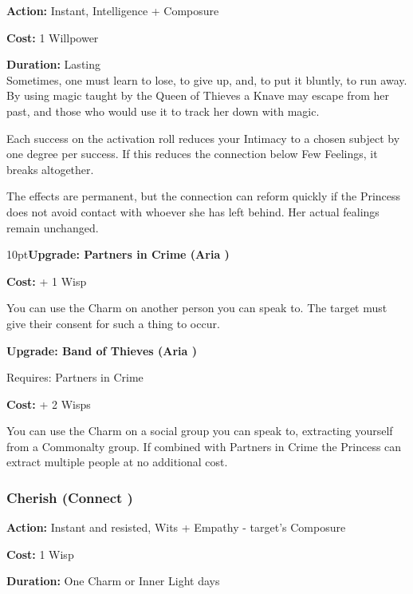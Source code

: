 \noindent \textbf{Action:} Instant, Intelligence + Composure 

\noindent \textbf{Cost:} 1 Willpower

\noindent \textbf{Duration:} Lasting \\

\noindent Sometimes, one must learn to lose, to give up, and, to put it bluntly, to run away. By using magic taught by the Queen of Thieves a Knave may escape from her past, and those who would use it to track her down with magic.

Each success on the activation roll reduces your Intimacy to a chosen subject by one degree per success. If this reduces the connection below Few Feelings, it breaks altogether. 

The effects are permanent, but the connection can reform quickly if the Princess does not avoid contact with whoever she has left behind. Her actual fealings remain unchanged.

\begin{myindentpar}{10pt}\textbf{Upgrade: Partners in Crime (Aria \textbullet\textbullet\textbullet\textbullet)}

\noindent \textbf{Cost:} + 1 Wisp

You can use the Charm on another person you can speak to. The target must give their consent for such a thing to occur.

\textbf{Upgrade: Band of Thieves (Aria \textbullet\textbullet\textbullet\textbullet\textbullet)}

\noindent Requires: Partners in Crime

\noindent \textbf{Cost:} + 2 Wisps

You can use the Charm on a social group you can speak to, extracting yourself from a Commonalty group. If combined with Partners in Crime the Princess can extract multiple people at no additional cost.\end{myindentpar}

\subsubsection*{Cherish (Connect \textbullet\textbullet\textbullet)}

\noindent \textbf{Action:} Instant and resisted, Wits + Empathy - target's Composure

\noindent \textbf{Cost:} 1 Wisp

\noindent \textbf{Duration:} One Charm or Inner Light days \\

